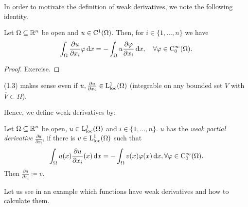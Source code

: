 In order to motivate the definition of weak derivatives, we note the following identity.

\begin{lem}
  Let $\Omega \subseteq \mathbb{R}^n$ be open and $u \in \mathrm{C}^1(\Omega)$. 
  Then, for $i \in \{1,\dots,n\}$ we have
  \begin{equation}
    \int_\Omega \frac{\partial u}{\partial x_i} \varphi \, {\operatorname{d}\!{x}} = -\int_\Omega u \frac{\partial \varphi}{\partial x_i} \, {\operatorname{d}\!{x}}, \quad \forall \varphi \in \mathrm{C}_0^\infty(\Omega).
  \end{equation}
\end{lem}
\begin{proof}
  Exercise.
\end{proof}
(1.3) makes sense even if $u, \frac{\partial u}{\partial x_i} \in \mathrm{L}_{\operatorname{loc}}^1(\Omega)$ (integrable on any bounded set $V$ with $\overline V \subset \Omega$).

Hence, we define weak derivatives by:

\begin{defn}
  Let $\Omega \subseteq \mathbb{R}^n$ be open, $u \in \mathrm{L}_{\operatorname{loc}}^1(\Omega)$ and $i \in \{1,\dots,n\}$.
  $u$ has the \emph{weak partial derivative} $\frac{\partial u}{\partial x_i}$, if there is $v \in \mathrm{L}_{\operatorname{loc}}^1(\Omega)$ such that
  \begin{equation}
    \int_\Omega u(x) \frac{\partial u}{\partial x_i}(x) \, {\operatorname{d}\!{x}} = -\int_\Omega v(x) \varphi(x) \, {\operatorname{d}\!{x}}, \forall \varphi \in \mathrm{C}_0^\infty(\Omega).    
  \end{equation}
  Then $\frac{\partial u}{\partial x_i} \coloneqq v$.
\end{defn}

Let us see in an example which functions have weak derivatives and how to calculate them.

